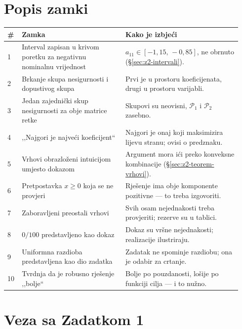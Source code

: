 \section{Popis zamki}
\label{sec:z2o-zamke}

\begin{longtable}{@{}p{0.05\linewidth} p{0.42\linewidth} p{0.47\linewidth}@{}}
\toprule
\textbf{\#} & \textbf{Zamka} & \textbf{Kako je izbjeći} \\
\midrule
\endhead
1 & Interval zapisan u krivom poretku za negativnu nominalnu vrijednost &
$a_{11} \in [-1{,}15,\,-0{,}85]$, ne obrnuto (\S\ref{sec:z2-intervali}). \\[5pt]
2 & Brkanje skupa nesigurnosti i dopustivog skupa & Prvi je u prostoru
koeficijenata, drugi u prostoru varijabli. \\[5pt]
3 & Jedan zajednički skup nesigurnosti za obje matrice retke & Skupovi su
neovisni, $\mathcal{P}_1$ i $\mathcal{P}_2$ zasebno. \\[5pt]
4 & ,,Najgori je najveći koeficijent`` & Najgori je onaj koji maksimizira lijevu
stranu; ovisi o predznaku. \\[5pt]
5 & Vrhovi obrazloženi intuicijom umjesto dokazom & Argument mora ići preko
konveksne kombinacije (\S\ref{sec:z2-teorem-vrhovi}). \\[5pt]
6 & Pretpostavka $x \geq 0$ koja se ne provjeri & Rješenje ima obje komponente
pozitivne --- to treba izgovoriti. \\[5pt]
7 & Zaboravljeni preostali vrhovi & Svih osam nejednakosti treba provjeriti;
rezerve su u tablici. \\[5pt]
8 & $0/100$ predstavljeno kao dokaz & Dokaz su vršne nejednakosti; realizacije
ilustriraju. \\[5pt]
9 & Uniformna razdioba predstavljena kao dio zadatka & Zadatak ne spominje
razdiobu; ona je odabir za crtanje. \\[5pt]
10 & Tvrdnja da je robusno rješenje ,,bolje`` & Bolje po pouzdanosti, lošije po
funkciji cilja --- i to nužno. \\
\bottomrule
\end{longtable}

\section{Veza sa Zadatkom 1}
\label{sec:z2o-veza}

